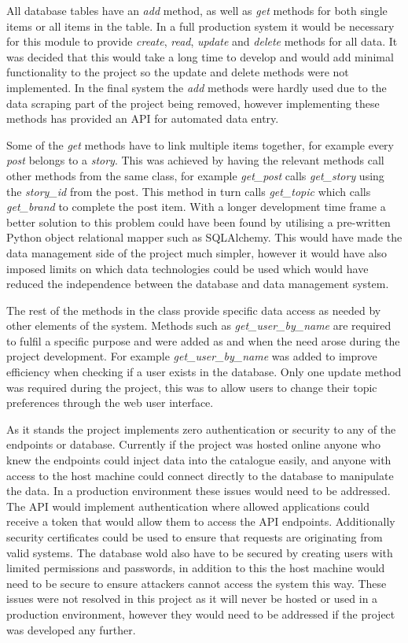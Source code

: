 \documentclass[12pt,titlepage]{article}
\begin{document}
  All database tables have an \textit{add} method, as well as \textit{get}
  methods for both single items or all items in the table. In a full production
  system it would be necessary for this module to provide \textit{create},
  \textit{read}, \textit{update} and \textit{delete} methods for all data. It
  was decided that this would take a long time to develop and would add minimal
  functionality to the project so the update and delete methods were not
  implemented. In the final system the \textit{add} methods were hardly used due
  to the data scraping part of the project being removed, however implementing
  these methods has provided an API for automated data entry.

  Some of the \textit{get} methods have to link multiple items together, for
  example every \textit{post} belongs to a \textit{story}. This was achieved by
  having the relevant methods call other methods from the same class, for
  example \textit{get\_post} calls \textit{get\_story} using the \textit{story\_id}
  from the post. This method in turn calls \textit{get\_topic} which calls
  \textit{get\_brand} to complete the post item. With a longer development
  time frame a better solution to this problem could have been found by utilising
  a pre-written Python object relational mapper such as SQLAlchemy. This would
  have made the data management side of the project much simpler, however it
  would have also imposed limits on which data technologies could be used which
  would have reduced the independence between the database and data management
  system.

  The rest of the methods in the class provide specific data access as needed by
  other elements of the system. Methods such as \textit{get\_user\_by\_name} are
  required to fulfil a specific purpose and were added as and when the need
  arose during the project development. For example \textit{get\_user\_by\_name}
  was added to improve efficiency when checking if a user exists in the
  database. Only one update method was required during the project, this was to
  allow users to change their topic preferences through the web user interface.

  As it stands the project implements zero authentication or security to any of
  the endpoints or database. Currently if the project was hosted online anyone
  who knew the endpoints could inject data into the catalogue easily, and anyone
  with access to the host machine could connect directly to the database to
  manipulate the data. In a production environment these issues would need to be
  addressed. The API would implement authentication where allowed applications
  could receive a token that would allow them to access the API endpoints.
  Additionally security certificates could be used to ensure that requests are
  originating from valid systems. The database wold also have to be secured by
  creating users with limited permissions and passwords, in addition to this the
  host machine would need to be secure to ensure attackers cannot access the
  system this way. These issues were not resolved in this project as it will
  never be hosted or used in a production environment, however they would need
  to be addressed if the project was developed any further.
\end{document}
